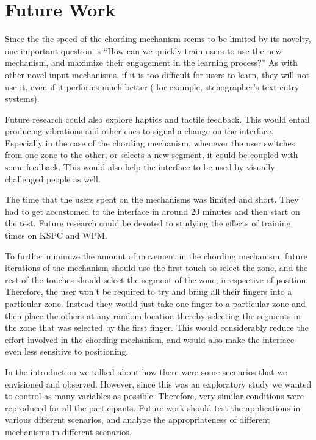 \section{Future Work}

Since the the speed of the chording mechanism seems to be limited by
its novelty, one important question is ``How can we quickly train
users to use the new mechanism, and maximize their engagement in the
learning process?''  As with other novel input mechanisms, if it is
too difficult for users to learn, they will not use it, even if it
performs much better ( for example, stenographer's text entry
systems).

Future research could also explore haptics and tactile feedback. This
would entail producing vibrations and other cues to signal a change on
the interface. Especially in the case of the chording mechanism,
whenever the user switches from one zone to the other, or selects a
new segment, it could be coupled with some feedback. This would also
help the interface to be used by visually challenged people as well.

The time that the users spent on the mechanisms was limited and short. They had to get accustomed to the interface in around 20 minutes and then start on the test. Future research could be devoted to studying the effects of training times on KSPC and WPM. 

To further minimize the amount of movement in the chording mechanism,
future iterations of the mechanism should use the first touch to
select the zone, and the rest of the touches should select the segment
of the zone, irrespective of position. Therefore, the user won't be
required to try and bring all their fingers into a particular
zone. Instead they would just take one finger to a particular zone and
then place the others at any random location thereby selecting the
segments in the zone that was selected by the first finger. This would
considerably reduce the effort involved in the chording mechanism, and
would also make the interface even less sensitive to positioning.

In the introduction we talked about how there were some scenarios that
we envisioned and observed. However, since this was an exploratory
study we wanted to control as many variables as possible. Therefore,
very similar conditions were reproduced for all the
participants. Future work should test the applications in various
different scenarios, and analyze the appropriateness of different
mechanisms in different scenarios.
